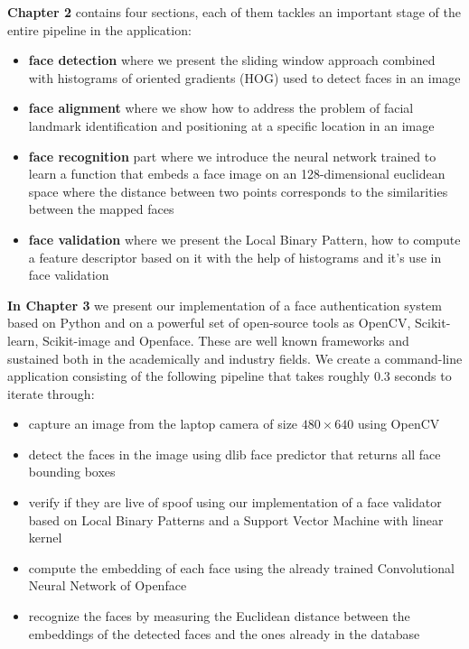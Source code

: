 \textbf{Chapter 2} contains four sections, each of them tackles an important stage of the entire pipeline in the application: 
\begin{itemize}
	\item \textbf{face detection} where we present the sliding window approach combined with histograms of oriented gradients (HOG) used to detect faces in an image
	\item \textbf{face alignment} where we show how to address the problem of facial landmark identification and positioning at a specific location in an image
	\item \textbf{face recognition} part where we introduce the neural network trained to learn a function that embeds a face image on an 128-dimensional euclidean space where the distance between two points corresponds to the similarities between the mapped faces
	\item \textbf{face validation} where we present the Local Binary Pattern, how to compute a feature descriptor based on it with the help of histograms and it's use in face validation
\end{itemize}

\textbf{In Chapter 3} we present our implementation of a face authentication system based on Python and on a powerful set of open-source tools as OpenCV\cite{opencv_library}, Scikit-learn\cite{scikit-learn}, Scikit-image\cite{scikit-image} and Openface\cite{amos2016openface}. These are well known frameworks and sustained both in the academically and industry fields. We create a command-line application consisting of the following pipeline that takes roughly $0.3$ seconds to iterate through:
\begin{itemize}
	\item capture an image from the laptop camera of size $480\times640$ using OpenCV
	\item detect the faces in the image using dlib face predictor that returns all face bounding boxes
	\item verify if they are live of spoof using our implementation of a face validator based on Local Binary Patterns and a Support Vector Machine with linear kernel
	\item compute the embedding of each face using the already trained Convolutional Neural Network of Openface
	\item recognize the faces by measuring the Euclidean distance between the embeddings of the detected faces and the ones already in the database
\end{itemize}

